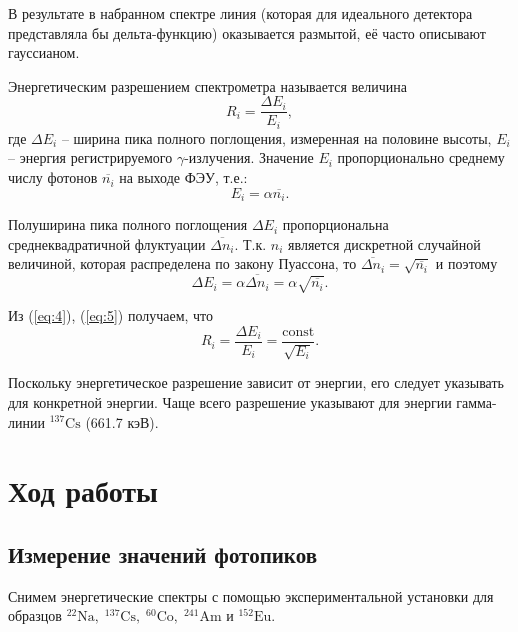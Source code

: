     В результате в набранном спектре линия (которая для идеального детектора представляла бы дельта-функцию) оказывается размытой, её часто описывают гауссианом.
    
    Энергетическим разрешением спектрометра называется величина
    \begin{equation}
        R_i=\frac{\Delta E_i}{E_i},
    \end{equation}
    где $\Delta E_i$ -- ширина пика полного поглощения, измеренная на половине высоты, $E_i$ -- энергия регистрируемого $\gamma$-излучения. Значение $E_i$ пропорционально среднему числу фотонов $\overline{n_i}$ на выходе ФЭУ, т.е.:
    \begin{equation}
        E_i = \alpha\overline{n_i}.
        \label{eq:4}
    \end{equation}

    Полуширина пика полного поглощения $\Delta E_i$ пропорциональна среднеквадратичной флуктуации $\overline{\Delta n_i}$. Т.к. $n_i$ является дискретной случайной величиной, которая распределена по закону Пуассона, то $\overline{\Delta n_i}=\sqrt{\overline{n_i}}$ и поэтому
    \begin{equation}
        \Delta E_i = \alpha\overline{\Delta n_i} = \alpha\sqrt{\overline{n_i}}.
        \label{eq:5}
    \end{equation}

    Из (\ref{eq:4}), (\ref{eq:5}) получаем, что
    \begin{equation}
        R_i = \frac{\Delta E_i}{E_i} = \frac{\text{const}}{\sqrt{E_i}}.
        \label{eq:6}
    \end{equation}

    Поскольку энергетическое разрешение зависит от энергии, его следует указывать для конкретной энергии. Чаще всего разрешение указывают для энергии гамма-линии $^{137}\text{Cs}$ (661.7 кэВ).

\section{Ход работы}
\subsection{Измерение значений фотопиков}

    Снимем энергетические спектры с помощью экспериментальной установки для образцов $\mathrm{^{22}Na, \; ^{137}Cs, \; ^{60}Co, \; ^{241}Am}$ и $\mathrm{^{152}Eu}$.

